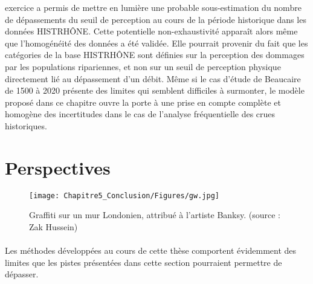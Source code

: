 exercice a permis de mettre en lumière une probable sous-estimation du nombre de dépassements du seuil de perception au cours de la période historique dans les données HISTRHÔNE. Cette potentielle non-exhaustivité apparaît alors même que l'homogénéité des données a été validée. Elle pourrait provenir du fait que les catégories de la base HISTRHÔNE sont définies sur la perception des dommages par les populations ripariennes, et non sur un seuil de perception physique directement lié au dépassement d'un débit. Même si le cas d'étude de Beaucaire de 1500 à 2020 présente des limites qui semblent difficiles à surmonter, le modèle proposé dans ce chapitre ouvre la porte à une prise en compte complète et homogène des incertitudes dans le cas de l'analyse fréquentielle des crues historiques. 

\newpage
	\section{Perspectives}
	
	\begin{figure}[h!]
	\centering
		\texttt{[image: Chapitre5\_Conclusion/Figures/gw.jpg]}
        \caption{Graffiti sur un mur Londonien, attribué à l'artiste Banksy. (source : Zak Hussein)}	
		\label{fig:gw}
	\end{figure}
		
	
	\paragraph{} Les méthodes développées au cours de cette thèse comportent évidemment des limites que les pistes présentées dans cette section pourraient permettre de dépasser. 
	
